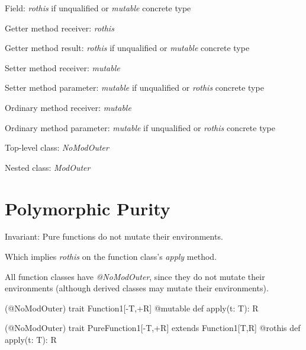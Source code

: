 Field: {\em rothis} if unqualified or {\em mutable} concrete type

Getter method receiver: {\em rothis}

Getter method result: {\em rothis} if unqualified or {\em mutable} concrete type

Setter method receiver: {\em mutable}

Setter method parameter: {\em mutable} if unqualified or {\em rothis} concrete type

Ordinary method receiver: {\em mutable}

Ordinary method parameter: {\em mutable} if unqualified or {\em rothis} concrete type

Top-level class: {\em NoModOuter}

Nested class: {\em ModOuter}


\section{Polymorphic Purity}

Invariant: Pure functions do not mutate their environments.

Which implies {\em rothis} on the function class's {\em apply} method.

All function classes have {\em @NoModOuter}, since they do not mutate their environments
(although derived classes may mutate their environments).

(@NoModOuter) trait Function1[-T,+R] {
  @mutable def apply(t: T): R
}

(@NoModOuter) trait PureFunction1[-T,+R] extends Function1[T,R] {
  @rothis def apply(t: T): R
}

